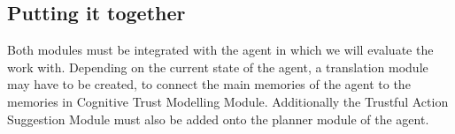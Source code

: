 \subsection{Putting it together}
Both modules must be integrated with the agent in which we will evaluate the work with. Depending on the current state of the agent, a translation module may have to be created, to connect the main memories of the agent to the memories in Cognitive Trust Modelling Module. Additionally the Trustful Action Suggestion Module must also be added onto the planner module of the agent.